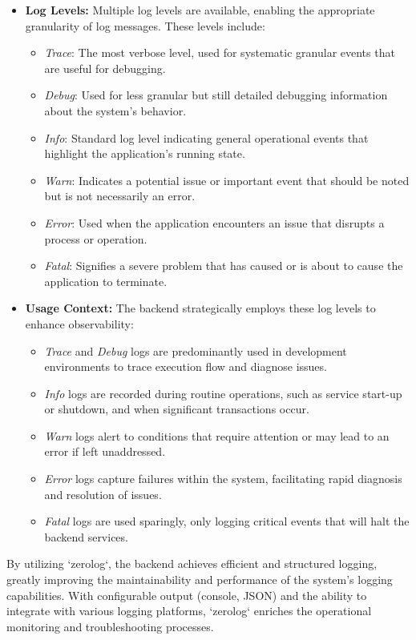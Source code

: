 \begin{itemize}
    \item \textbf{Log Levels:} Multiple log levels are available, enabling the appropriate granularity of log messages.
    These levels include:
    \begin{itemize}
        \item \textit{Trace}: The most verbose level, used for systematic granular events that are useful for debugging.
        \item \textit{Debug}: Used for less granular but still detailed debugging information about the system's behavior.
        \item \textit{Info}: Standard log level indicating general operational events that highlight the application's running state.
        \item \textit{Warn}: Indicates a potential issue or important event that should be noted but is not necessarily an error.
        \item \textit{Error}: Used when the application encounters an issue that disrupts a process or operation.
        \item \textit{Fatal}: Signifies a severe problem that has caused or is about to cause the application to terminate.
    \end{itemize}
    \item \textbf{Usage Context:} The backend strategically employs these log levels to enhance observability:
    \begin{itemize}
        \item \textit{Trace} and \textit{Debug} logs are predominantly used in development environments to trace execution flow and diagnose issues.
        \item \textit{Info} logs are recorded during routine operations, such as service start-up or shutdown, and when significant transactions occur.
        \item \textit{Warn} logs alert to conditions that require attention or may lead to an error if left unaddressed.
        \item \textit{Error} logs capture failures within the system, facilitating rapid diagnosis and resolution of issues.
        \item \textit{Fatal} logs are used sparingly, only logging critical events that will halt the backend services.
    \end{itemize}
\end{itemize}

By utilizing `zerolog`, the backend achieves efficient and structured logging, greatly improving the maintainability and performance of the system's logging capabilities.
With configurable output (console, JSON) and the ability to integrate with various logging platforms, `zerolog` enriches the operational monitoring and troubleshooting processes.


